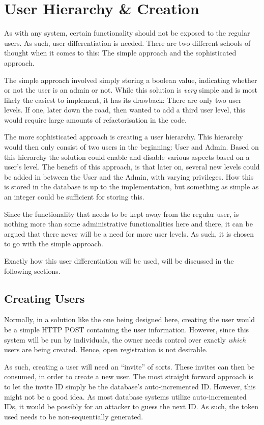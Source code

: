 	\section{User Hierarchy \& Creation}
		\label{sec:user:diff}
		As with any system, certain functionality should not be exposed to the regular users. As such, user differentiation is needed. There are two different schools of thought when it comes to this: The simple approach and the sophisticated approach.

		The simple approach involved simply storing a boolean value, indicating whether or not the user is an admin or not. While this solution is \emph{very} simple and is most likely the easiest to implement, it has its drawback: There are only two user levels. If one, later down the road, then wanted to add a third user level, this would require large amounts of refactorisation in the code.

		The more sophisticated approach is creating a user hierarchy. This hierarchy would then only consist of two users in the beginning: User and Admin. Based on this hierarchy the solution could enable and disable various aspects based on a user's level. The benefit of this approach, is that later on, several new levels could be added in between the User and the Admin, with varying privileges. How this is stored in the database is up to the implementation, but something as simple as an integer could be sufficient for storing this.

		Since the functionality that needs to be kept away from the regular user, is nothing more than some administrative functionalities here and there, it can be argued that there never will be a need for more user levels. As such, it is chosen to go with the simple approach. 

		Exactly how this user differentiation will be used, will be discussed in the following sections.

		\subsection{Creating Users}	
			Normally, in a solution like the one being designed here, creating the user would be a simple HTTP POST containing the user information. However, since this system will be run by individuals, the owner needs control over exactly \emph{which} users are being created. Hence, open registration is not desirable.

			As such, creating a user will need an ``invite'' of sorts. These invites can then be consumed, in order to create a new user. The most straight forward approach is to let the invite ID simply be the database's auto-incremented ID. However, this might not be a good idea. As most database systems utilize auto-incremented IDs, it would be possibly for an attacker to guess the next ID. As such, the token used needs to be non-sequentially generated.


